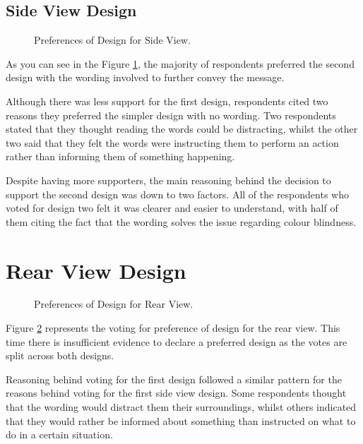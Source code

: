 \documentclass{l4proj}
\begin{document}
\subsection{Side View Design}

\begin{figure}[htbp]
    \centering
    \caption{Preferences of Design for Side View.}
    \label{fig:pie_chart1}
\end{figure}

As you can see in the Figure \ref{fig:pie_chart1}, the majority of respondents preferred the second design with the wording involved to further convey the message.

Although there was less support for the first design, respondents cited two reasons they preferred the simpler design with no wording. Two respondents stated that they thought reading the words could be distracting, whilst the other two said that they felt the words were instructing them to perform an action rather than informing them of something happening.

Despite having more supporters, the main reasoning behind the decision to support the second design was down to two factors. All of the respondents who voted for design two felt it was clearer and easier to understand, with half of them citing the fact that the wording solves the issue regarding colour blindness.

\section{Rear View Design}

\begin{figure}[htbp]
    \centering
    \caption{Preferences of Design for Rear View.}
    \label{fig:pie_chart2}
\end{figure}

Figure \ref{fig:pie_chart2} represents the voting for preference of design for the rear view. This time there is insufficient evidence to declare a preferred design as the votes are split across both designs.

Reasoning behind voting for the first design followed a similar pattern for the reasons behind voting for the first side view design. Some respondents thought that the wording would distract them their surroundings, whilst others indicated that they would rather be informed about something than instructed on what to do in a certain situation.
\end{document}
